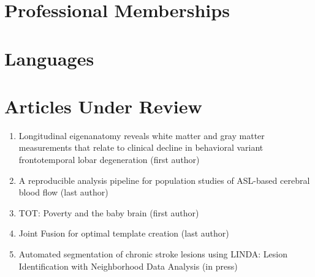 \documentclass[11pt]{moderncv} %
\begin{document}
\section{Professional Memberships}

\section{Languages}



\section{Articles Under Review}

\begin{enumerate}
\item Longitudinal eigenanatomy reveals white matter and gray matter
  measurements that relate to clinical decline in behavioral variant
  frontotemporal lobar degeneration (first author)
\item A reproducible analysis pipeline for population studies of ASL-based cerebral blood flow (last author)
\item TOT: Poverty and the baby brain (first author)
\item Joint Fusion for optimal template creation (last author)
\item Automated segmentation of chronic stroke lesions using LINDA: Lesion Identification with Neighborhood Data Analysis (in press)
\end{enumerate}
\end{document}
